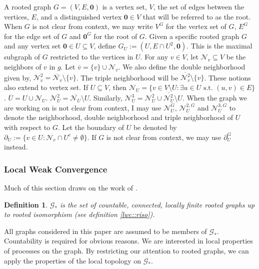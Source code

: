 \documentclass[12pt]{article}
\newcommand{\mc}{\mathcal}
\newcommand{\ov}{\overline}
\newcommand{\te}{\text}
\newcommand{\defeq}{:=}								%
\newcommand{\neigh}[1]{\mc{N}_{#1}}					%
\newcommand{\dneigh}[1]{\mc{N}^2_{#1}}				%
\newcommand{\tneigh}[1]{\mc{N}^3_{#1}}				%
\newcommand{\gneigh}[2]{\mc{N}^{#1}_{#2}}			%
\newcommand{\dgneigh}[2]{\mc{N}^{2,#1}_{#2}}		%
\newcommand{\tgneigh}[2]{\mc{N}^{3,#1}_{#2}}		%
\newcommand{\bdry}[1]{\partial_{#1}}				%
\newcommand{\gbdry}[2]{\partial^{#1}_{#2}}			%
\newcommand{\cl}[1]{\ov{#1}}						%
\renewcommand{\root}{\mathbf{0}}					%
\newcommand{\subg}[1]{_{#1}}						%
\newcommand{\gind}[1]{^{#1}}						%
\newcommand{\Gs}{\mc{G}_\ast}						%
\newtheorem{defn}[thms]{Definition}
\begin{document}
A rooted graph \(G = (V,E,\root)\) is a vertex set, \(V\), the set of edges between the vertices, \(E\), and a distinguished vertex \(\root \in V\) that will be referred to as the root. When \(G\) is not clear from context, we may write \(V\gind{G}\) for the vertex set of \(G\), \(E\gind{G}\) for the edge set of \(G\) and \(\root\gind{G}\) for the root of \(G\). Given a specific rooted graph \(G\) and any vertex set \(\root \in U \subseteq V\), define \(G\subg{U} \defeq (U,E\cap U^2,\root)\). This is the maximal subgraph of \(G\) restricted to the vertices in \(U\). For any \(v \in V\), let \(\neigh{v}\subseteq V\) be the neighbors of \(v\) in \(g\). Let \(\cl{v} = \{v\}\cup\neigh{v}\). We also define the double neighborhood given by, \(\dneigh{v} = \cl{\neigh{v}}\setminus \{v\}\). The triple neighborhood will be \(\cl{\dneigh{v}} \setminus \{v\}\). These notions also extend to vertex set. If \(U\subseteq V\), then \(\neigh{U} = \{v \in V\setminus U: \exists u \in U\te{ s.t. } (u,v) \in E\}\). \(\cl{U} = U\cup \neigh{U}\). \(\dneigh{U} = \cl{\neigh{U}}\setminus U\). Similarly, \(\tneigh{U} = \dneigh{U} \cup \cl{\dneigh{U}}\setminus U\). When the graph we are working on is not clear from context, I may use \(\gneigh{G}{U}\), \(\dgneigh{G}{U}\) and \(\tgneigh{G}{U}\) to denote the neighborhood, double neighborhood and triple neighborhood of \(U\) with respect to \(G\). Let the boundary of \(U\) be denoted by \(\bdry{U} \defeq \{v \in U: \neigh{v}\cap U^c \neq \emptyset\}\). If \(G\) is not clear from context, we may use \(\gbdry{G}{U}\) instead.

\subsubsection{Local Weak Convergence}
\label{g::lwc}

Much of this section draws on the work of \cite{LacRamWu19}.

\begin{defn}
\(\Gs\) is the set of countable, connected, locally finite rooted graphs up to rooted isomorphism (see definition \ref{lwc::riso}).
\label{lwc::gstar}
\end{defn}

All graphs considered in this paper are assumed to be members of \(\Gs\). Countability is required for obvious reasons. We are interested in local properties of processes on the graph. By restricting our attention to rooted graphs, we can apply the properties of the local topology on \(\Gs\). 
\end{document}
